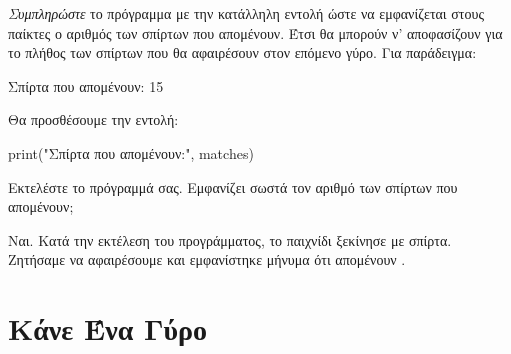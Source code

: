 \documentclass[a4paper,11pt,oneside]{book}
\begin{document}
\begin{step}
\emph{Συμπληρώστε} το πρόγραμμα με την κατάλληλη εντολή ώστε να εμφανίζεται στους παίκτες ο αριθμός των σπίρτων που απομένουν. Έτσι θα μπορούν ν' αποφασίζουν για το πλήθος των σπίρτων που θα αφαιρέσουν στον επόμενο γύρο. Για παράδειγμα:

\marginnote[14pt]{\iconcomputer}
\begin{pyterm}
Σπίρτα που απομένουν: 15
\end{pyterm}

\clearpage
\begin{answer}
Θα προσθέσουμε την εντολή:

\begin{pynew}
print("Σπίρτα που απομένουν:", matches)
\end{pynew}
\end{answer}

Εκτελέστε το πρόγραμμά σας. Εμφανίζει σωστά τον αριθμό των σπίρτων που απομένουν;

\begin{answer}
Ναι. Κατά την εκτέλεση του προγράμματος, το παιχνίδι ξεκίνησε με  σπίρτα. Ζητήσαμε να αφαιρέσουμε  και εμφανίστηκε μήνυμα ότι απομένουν .
\end{answer}
\end{step}

\section{Κάνε Ένα Γύρο}
\end{document}
